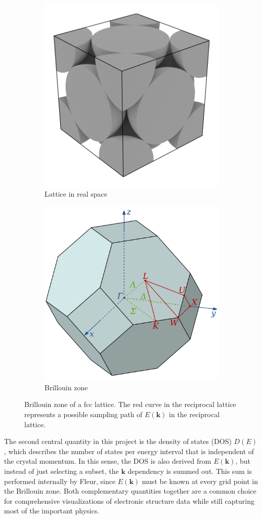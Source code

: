 \begin{figure}[htb!]
    \centering
    \begin{subfigure}{.5\textwidth}
        \centering
        \includegraphics[width=0.5\linewidth]{christian/fcc_real.png}
        \caption{Lattice in real space}
        \label{fig:fcc_real}
    \end{subfigure}%
    \begin{subfigure}{.5\textwidth}
        \centering
        \includegraphics[width=0.5\linewidth]{christian/Brillouin_Zone_(1st,_FCC).png}
        \caption{Brillouin zone}
        \label{fig:fcc_billouin}
    \end{subfigure}
    \caption[Brillouin zone of a fcc lattice]{Brillouin zone of a fcc lattice. The red curve in the reciprocal lattice represents a possible sampling path of $E(\mathbf{k})$ in the reciprocal lattice.}
    \label{fcc}
\end{figure}

The second central quantity in this project is the density of states (DOS)
$D(E)$, which describes the number of states per energy interval that is
independent of the crystal momentum. In this sense, the DOS is also derived from
$E(\mathbf{k})$, but instead of just selecting a subset, the $\mathbf{k}$
dependency is summed out. This sum is performed internally by Fleur, since
$E(\mathbf{k})$ must be known at every grid point in the Brillouin zone. Both complementary quantities together are a common choice for comprehensive visualizations of electronic structure data while still capturing most of the important physics. 


